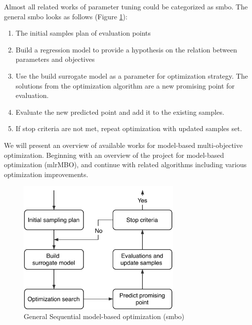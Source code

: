         Almost all related works of parameter tuning could be categorized as \gls{smbo}\cite{JonesSW98}.
        The general \gls{smbo} looks as follows (Figure \ref{fig:sequential_mbo}):
        \begin{enumerate}
            \item The initial samples plan of evaluation points
            \item Build a regression model to provide a hypothesis on the relation between parameters and objectives
            \item Use the build surrogate model as a parameter for optimization strategy. The solutions from the optimization algorithm are a new promising point for evaluation.
            \item Evaluate the new predicted point and add it to the existing samples.
            \item If stop criteria are not met, repeat optimization with updated samples set.
        \end{enumerate}
        We will present an overview of available works for model-based multi-objective optimization. Beginning with an overview of the project for model-based optimization (mlrMBO), and continue with related algorithms including various optimization improvements.

        \begin{figure}
            \centering 
            \includegraphics[width=8cm]{content/images/utility/sequential_mbo}
            \caption[General Sequential model-based optimization]{General Sequential model-based optimization (\Gls{smbo})} 
            \label{fig:sequential_mbo} 
        \end{figure}



